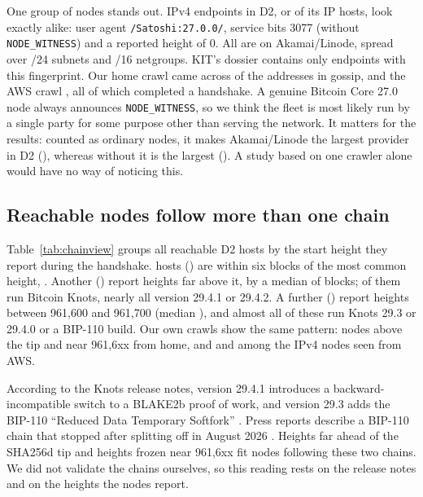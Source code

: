 \documentclass[10pt,a4paper]{article}
\begin{document}
One group of nodes stands out. \FleetN{} IPv4 endpoints in D2, or \FleetShareIP{} of its IP hosts, look exactly alike: user agent \texttt{/Satoshi:27.0.0/}, service bits 3077 (without \texttt{NODE\_\allowbreak{}WITNESS}) and a reported height of 0. All \FleetLinode{} are on Akamai/Linode, spread over \FleetSubnets{} /24 subnets and \FleetNetgroups{} /16 netgroups. KIT's dossier contains only \FleetKIT{} endpoints with this fingerprint. Our home crawl came across \FleetDoneSeen{} of the addresses in gossip, and the AWS crawl \FleetAwsSeen{}, all of which completed a handshake. A genuine Bitcoin Core 27.0 node always announces \texttt{NODE\_\allowbreak{}WITNESS}, so we think the fleet is most likely run by a single party for some purpose other than serving the network. It matters for the results: counted as ordinary nodes, it makes Akamai/Linode the largest provider in D2 (\DtwoProvTopone), whereas without it \DtwoFProvToponeLabel{} is the largest (\DtwoFProvTopone). A study based on one crawler alone would have no way of noticing this.

\subsection{Reachable nodes follow more than one chain}\label{sec:chain}

Table~\ref{tab:chainview} groups all reachable D2 hosts by the start height they report during the handshake. \Chaintip{} hosts (\ChaintipShare) are within six blocks of the most common height, \ObservedTip. Another \Chainabovetip{} (\ChainabovetipShare) report heights far above it, by a median of \AboveMedian{} blocks; \ChainAboveKnots{} of them run Bitcoin Knots, nearly all version 29.4.1 or 29.4.2. A further \ChainstalledNineSixOnek{} (\ChainstalledNineSixOnekShare) report heights between 961{,}600 and 961{,}700 (median \StalledMedian), and almost all of these run Knots 29.3 or 29.4.0 or a BIP-110 build. Our own crawls show the same pattern: \DoneAbove{} nodes above the tip and \DoneStalled{} near 961{,}6xx from home, and \DonebAbove{} and \DonebStalled{} among the IPv4 nodes seen from AWS.



According to the Knots release notes, version 29.4.1 introduces a backward-incompatible switch to a BLAKE2b proof of work, and version 29.3 adds the BIP-110 ``Reduced Data Temporary Softfork'' \cite{knots2026notes}. Press reports describe a BIP-110 chain that stopped after splitting off in August 2026 \cite{cryptoslate2026knots}. Heights far ahead of the SHA256d tip and heights frozen near 961{,}6xx fit nodes following these two chains. We did not validate the chains ourselves, so this reading rests on the release notes and on the heights the nodes report.
\end{document}
